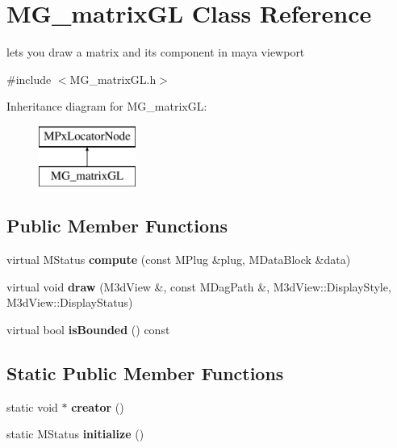 \hypertarget{class_m_g__matrix_g_l}{\section{M\-G\-\_\-matrix\-G\-L Class Reference}
\label{class_m_g__matrix_g_l}
}


lets you draw a matrix and its component in maya viewport  




{\ttfamily \#include $<$M\-G\-\_\-matrix\-G\-L.\-h$>$}

Inheritance diagram for M\-G\-\_\-matrix\-G\-L\-:\begin{figure}[H]
\begin{center}
\leavevmode
\includegraphics[height=2.000000cm]{class_m_g__matrix_g_l}
\end{center}
\end{figure}
\subsection*{Public Member Functions}
\begin{DoxyCompactItemize}
\item 
\hypertarget{class_m_g__matrix_g_l_ac995256ef4a535232fa6788b7fe1189f}{virtual M\-Status {\bfseries compute} (const M\-Plug \&plug, M\-Data\-Block \&data)}\label{class_m_g__matrix_g_l_ac995256ef4a535232fa6788b7fe1189f}

\item 
\hypertarget{class_m_g__matrix_g_l_a75e45bee0da671dad1d512e7d7dd9d3a}{virtual void {\bfseries draw} (M3d\-View \&, const M\-Dag\-Path \&, M3d\-View\-::\-Display\-Style, M3d\-View\-::\-Display\-Status)}\label{class_m_g__matrix_g_l_a75e45bee0da671dad1d512e7d7dd9d3a}

\item 
\hypertarget{class_m_g__matrix_g_l_a242cc3e4b56142522d4480069d67c57b}{virtual bool {\bfseries is\-Bounded} () const }\label{class_m_g__matrix_g_l_a242cc3e4b56142522d4480069d67c57b}

\end{DoxyCompactItemize}
\subsection*{Static Public Member Functions}
\begin{DoxyCompactItemize}
\item 
\hypertarget{class_m_g__matrix_g_l_a5993a93a0856c270e1b46a31afc1d599}{static void $\ast$ {\bfseries creator} ()}\label{class_m_g__matrix_g_l_a5993a93a0856c270e1b46a31afc1d599}

\item 
\hypertarget{class_m_g__matrix_g_l_adbdd2fb4a340382c56397cbd99c3d9f2}{static M\-Status {\bfseries initialize} ()}\label{class_m_g__matrix_g_l_adbdd2fb4a340382c56397cbd99c3d9f2}

\end{DoxyCompactItemize}
